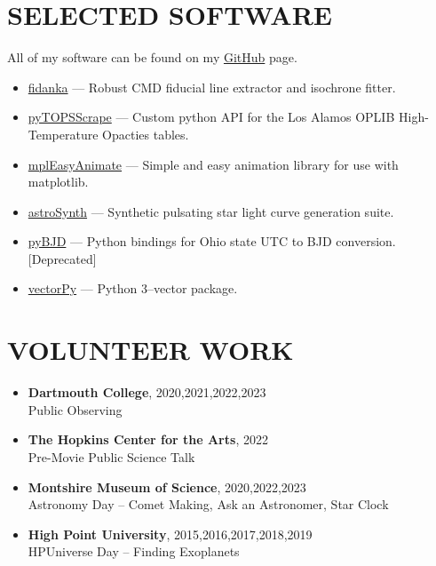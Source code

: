 \documentclass[margin, 10pt]{res} %
\begin{document}
\begin{resume}
\section{SELECTED SOFTWARE}
All of my software can be found on my \href{https://github.com/tboudreaux}{GitHub} page.
\begin{itemize}
	\item \href{https://github.com/tboudreaux/fidanka}{fidanka} --- Robust CMD fiducial line extractor and isochrone fitter.
	\item \href{https://github.com/tboudreaux/pytopsscrape}{pyTOPSScrape} --- Custom python API for the Los Alamos OPLIB High-Temperature Opacties tables.
	\item \href{https://github.com/tboudreaux/mpl_animate}{mplEasyAnimate} --- Simple and easy animation library for use with matplotlib.
	\item \href{https://github.com/AstroSynth/astroSynth}{astroSynth} --- Synthetic pulsating star light curve generation suite.
	\item \href{https://github.com/tboudreaux/pyBJD}{pyBJD} --- Python bindings for Ohio state UTC to BJD conversion. [Deprecated]
	\item \href{https://github.com/tboudreaux/vectorpy}{vectorPy} --- Python 3--vector package.
\end{itemize}

\section{VOLUNTEER WORK}
\begin{itemize}
	\item {\scriptsize \textbf{Dartmouth College}}, {\small 2020,2021,2022,2023} \\ Public Observing
	\item {\scriptsize \textbf{The Hopkins Center for the Arts}}, {\small 2022} \\ Pre-Movie Public Science Talk
	\item {\scriptsize \textbf{Montshire Museum of Science}}, {\small 2020,2022,2023} \\ Astronomy Day -- Comet Making, Ask an Astronomer, Star Clock
	\item {\scriptsize \textbf{High Point University}}, {\small 2015,2016,2017,2018,2019} \\ HPUniverse Day -- Finding Exoplanets
\end{itemize}


\end{resume}
\end{document}
